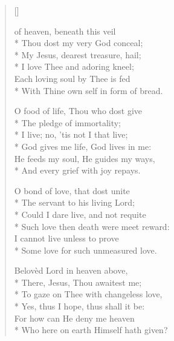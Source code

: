\newHymn

\settowidth{\versewidth}{O bread of heaven, beneath this veil}

\begin{verse}[\versewidth]

\begin{patverse}
 of heaven, beneath this veil  \\*   
 Thou dost my very God conceal;\\*
 My Jesus, dearest treasure, hail;\\*
 I love Thee and adoring kneel;     \\
 Each loving soul by Thee is fed      \\*  
 With Thine own self in form of bread.  
\end{patverse}

\begin{patverse}
O food of life, Thou who dost give  \\*
 The pledge of immortality;             \\*
 I live; no,  'tis not I that live;      \\*
 God gives me life, God lives in me:    \\
 He feeds my soul, He guides my ways,   \\*
 And every grief with joy repays.       
\end{patverse}

\begin{patverse}
O bond of love, that dost unite     \\*
 The servant to his living Lord;        \\*
 Could I dare live, and not requite     \\*
 Such love then death were meet reward: \\
 I cannot live unless to prove          \\*
 Some love for such unmeasured love.    
\end{patverse}

\begin{patverse}
 Belovèd Lord in heaven above,       \\*
 There, Jesus, Thou awaitest me;        \\*
 To gaze on Thee with changeless love,  \\*
 Yes, thus I hope, thus shall it be:    \\
 For how can He deny me heaven          \\*
 Who here on earth Himself hath given?  
\end{patverse}
 
 \end{verse}
                                        



